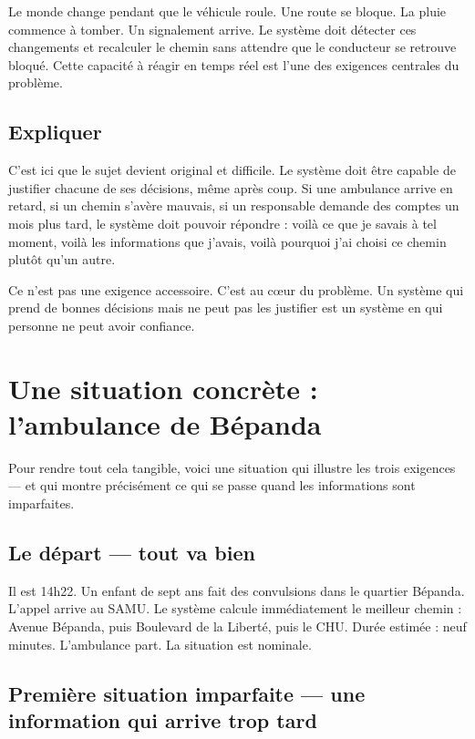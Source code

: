 \documentclass[12pt, a4paper]{article}
\begin{document}
Le monde change pendant que le véhicule roule. Une route se bloque.
La pluie commence à tomber. Un signalement arrive. Le système doit
détecter ces changements et recalculer le chemin sans attendre que
le conducteur se retrouve bloqué. Cette capacité à réagir en temps
réel est l'une des exigences centrales du problème.

\subsection{Expliquer}

C'est ici que le sujet devient original et difficile. Le système doit
être capable de justifier chacune de ses décisions, même après coup.
Si une ambulance arrive en retard, si un chemin s'avère mauvais, si
un responsable demande des comptes un mois plus tard, le système doit
pouvoir répondre : voilà ce que je savais à tel moment, voilà les
informations que j'avais, voilà pourquoi j'ai choisi ce chemin plutôt
qu'un autre.

Ce n'est pas une exigence accessoire. C'est au c\oe{}ur du problème.
Un système qui prend de bonnes décisions mais ne peut pas les justifier
est un système en qui personne ne peut avoir confiance.


\section{Une situation concrète : l'ambulance de Bépanda}

Pour rendre tout cela tangible, voici une situation qui illustre les
trois exigences — et qui montre précisément ce qui se passe quand les
informations sont imparfaites.

\subsection{Le départ — tout va bien}

Il est 14h22. Un enfant de sept ans fait des convulsions dans le quartier
Bépanda. L'appel arrive au SAMU. Le système calcule immédiatement le
meilleur chemin : Avenue Bépanda, puis Boulevard de la Liberté, puis le
CHU. Durée estimée : neuf minutes. L'ambulance part. La situation est
nominale.

\subsection{Première situation imparfaite — une information qui arrive trop tard}
\end{document}
